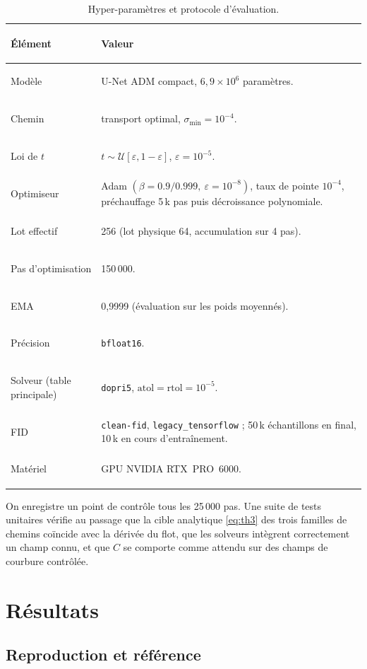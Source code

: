 \documentclass[11pt]{article}
\newcommand{\code}[1]{\texttt{#1}}
\begin{document}
\begin{table}[htbp]
\centering
\caption{Hyper-paramètres et protocole d'évaluation.}
\label{tab:config}
\begin{tabularx}{\textwidth}{>{\bfseries\raggedright\arraybackslash}p{3.8cm} X}
\toprule
Élément & Valeur \\
\midrule
Modèle        & U-Net ADM compact, $6{,}9\times10^{6}$ paramètres. \\
Chemin        & transport optimal, $\sigma_{\min} = 10^{-4}$. \\
Loi de $t$    & $t \sim \mathcal{U}[\varepsilon, 1-\varepsilon]$, $\varepsilon = 10^{-5}$. \\
Optimiseur    & Adam $(\beta=0.9/0.999,\ \varepsilon=10^{-8})$, taux de pointe $10^{-4}$, préchauffage 5\,k pas puis décroissance polynomiale. \\
Lot effectif  & 256 (lot physique 64, accumulation sur 4 pas). \\
Pas d'optimisation & 150\,000. \\
EMA           & 0,9999 (évaluation sur les poids moyennés). \\
Précision     & \code{bfloat16}. \\
Solveur (table principale) & \code{dopri5}, $\text{atol} = \text{rtol} = 10^{-5}$. \\
FID           & \code{clean-fid}, \code{legacy\_tensorflow} ; 50\,k échantillons en final, 10\,k en cours d'entraînement. \\
Matériel      & GPU NVIDIA RTX~PRO~6000. \\
\bottomrule
\end{tabularx}
\end{table}

On enregistre un point de contrôle tous les 25\,000 pas. Une suite de tests unitaires vérifie au passage que
la cible analytique \eqref{eq:th3} des trois familles de chemins coïncide avec la dérivée du flot, que les
solveurs intègrent correctement un champ connu, et que $C$ se comporte comme attendu sur des champs de
courbure contrôlée.

\section{Résultats}
\label{sec:results}

\subsection{Reproduction et référence}
\label{sec:main}
\end{document}
